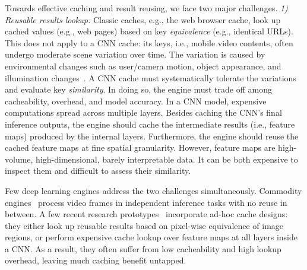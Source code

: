 \documentclass[10pt,acmtog]{acmart}
\newcommand{\variation}{scene variations\xspace}
\newcommand{\mengwei}[1]{{\color{red}{#1}}}
\begin{document}
Towards effective caching and result reusing, we face two major challenges.
\textit{1) Reusable results lookup:}%
Classic caches, e.g., the web browser cache, look up cached values (e.g., web pages) based on key \textit{equivalence} (e.g., identical URLs).
This does not apply to a CNN cache: 
its keys, i.e., mobile video contents, often undergo moderate scene variation over time.
The variation is caused by environmental changes such as user/camera motion, object appearance, and illumination changes~\cite{UCF101}.
A CNN cache must systematically tolerate the variations and evaluate key \textit{similarity}. 
In doing so, the engine must trade off among cacheability, overhead, and model accuracy. 
In a CNN model, expensive computations spread across multiple layers.
Besides caching the CNN's final inference outputs, 
the engine should cache the intermediate results (i.e., feature maps) produced by the internal layers. 
Furthermore, the engine should reuse the cached feature maps at fine spatial granularity. %
However, feature maps are high-volume, high-dimensional, barely interpretable data. 
It can be both expensive to inspect them and difficult to assess their similarity.

Few deep learning engines address the two challenges simultaneously.
Commodity engines~\cite{TensorFlow,caffe2,ncnn} process video frames in independent inference tasks with no reuse in between. 
A few recent research prototypes~\cite{conf/mobisys/LocLB17,cavigelli2017cbinfer} incorporate ad-hoc cache designs:
they either look up reusable results based on pixel-wise equivalence of image regions, or perform expensive cache lookup over feature maps at all layers inside a CNN. %
As a result, they often suffer from low cacheability and high lookup overhead, leaving much caching benefit untapped.
\end{document}
